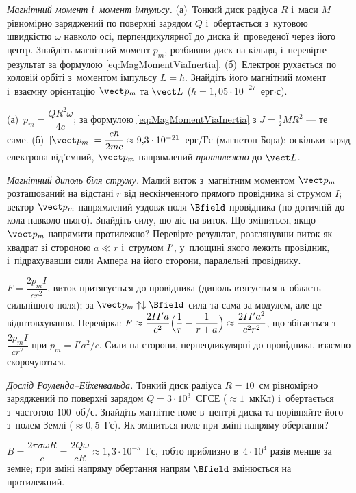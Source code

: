 \begin{problem}\label{prb:RotatingDiskMoment}
	\emph{Магнітний момент і~момент імпульсу.} (а)~Тонкий диск радіуса $R$ і~маси $M$
	рівномірно заряджений по поверхні зарядом $Q$ і~обертається з~кутовою швидкістю
	$\omega$ навколо осі, перпендикулярної до диска й~проведеної через його центр.
	Знайдіть магнітний момент $p_m$, розбивши диск на кільця, і~перевірте результат за
	формулою \eqref{eq:MagMomentViaInertia}. (б)~Електрон рухається по коловій орбіті
	з~моментом імпульсу $L=\hbar$. Знайдіть його магнітний момент і~взаємну орієнтацію
	$\vect p_m$ та $\vect L$ ($\hbar=1{,}05\cdot10^{-27}$~ерг$\cdot$с).
	\begin{solution}
		(а)~$p_m=\dfrac{QR^2\omega}{4c}$; за формулою \eqref{eq:MagMomentViaInertia} з $J=\tfrac12MR^2$ --- те саме. (б)~$|\vect p_m|=\dfrac{e\hbar}{2mc}\approx9{,}3\cdot10^{-21}$~ерг/Гс (магнетон Бора); оскільки заряд електрона від'ємний, $\vect p_m$ напрямлений \emph{протилежно} до $\vect L$.
	\end{solution}
\end{problem}

\begin{problem}\label{prb:DipoleNearWire}
	\emph{Магнітний диполь біля струму.} Малий виток з~магнітним моментом $\vect p_m$
	розташований на відстані $r$ від нескінченного прямого провідника зі струмом $I$;
	вектор $\vect p_m$ напрямлений уздовж поля $\Bfield$ провідника (по дотичній до кола
	навколо нього). Знайдіть силу, що діє на виток. Що зміниться, якщо $\vect p_m$
	напрямити протилежно? Перевірте результат, розглянувши виток як квадрат зі стороною
	$a\ll r$ і~струмом $I'$, у~площині якого лежить провідник, і~підрахувавши сили Ампера
	на його сторони, паралельні провіднику.
	\begin{solution}
		$F=\dfrac{2p_mI}{cr^2}$, виток притягується до провідника (диполь втягується в~область сильнішого поля);
		за $\vect p_m\uparrow\downarrow\Bfield$ сила та сама за модулем, але це відштовхування.
		Перевірка: $F\approx\dfrac{2II'a}{c^2}\Bigl(\dfrac1r-\dfrac1{r+a}\Bigr)\approx\dfrac{2II'a^2}{c^2r^2}$, що збігається з $\dfrac{2p_mI}{cr^2}$ при $p_m=I'a^2/c$. Сили на сторони, перпендикулярні до провідника, взаємно скорочуються.
	\end{solution}
\end{problem}

\begin{problem}\label{prb:RowlandDisk}
	\emph{Дослід Роуленда--Ейхенвальда.} Тонкий диск радіуса $R = 10$~см рівномірно
	заряджений по поверхні зарядом $Q = 3\cdot10^{3}$~СГСЕ ($\approx 1$~мкКл)
	і~обертається з~частотою $100$~об/с. Знайдіть магнітне поле в~центрі диска та
	порівняйте його з~полем Землі ($\approx 0{,}5$~Гс). Як зміниться поле при зміні
	напряму обертання?
	\begin{solution}
		$B = \dfrac{2\pi\sigma\omega R}{c} = \dfrac{2Q\omega}{cR} \approx 1{,}3\cdot10^{-5}$~Гс, тобто приблизно в~$4\cdot10^{4}$
		разів менше за земне; при зміні напряму обертання напрям $\Bfield$ змінюється на протилежний.
	\end{solution}
\end{problem}

